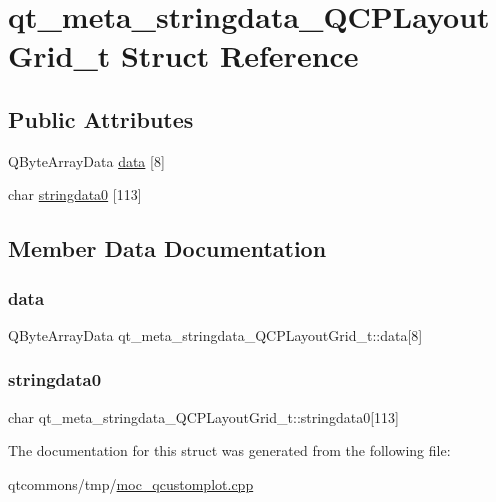 \hypertarget{structqt__meta__stringdata___q_c_p_layout_grid__t}{}\section{qt\+\_\+meta\+\_\+stringdata\+\_\+\+Q\+C\+P\+Layout\+Grid\+\_\+t Struct Reference}
\label{structqt__meta__stringdata___q_c_p_layout_grid__t}
\subsection*{Public Attributes}
\begin{DoxyCompactItemize}
\item 
Q\+Byte\+Array\+Data \mbox{\hyperlink{structqt__meta__stringdata___q_c_p_layout_grid__t_a8aec8565fec735b55e957fb91729f90c}{data}} \mbox{[}8\mbox{]}
\item 
char \mbox{\hyperlink{structqt__meta__stringdata___q_c_p_layout_grid__t_afbe8e2975fe74d0cea2af91ee7282757}{stringdata0}} \mbox{[}113\mbox{]}
\end{DoxyCompactItemize}


\subsection{Member Data Documentation}
\mbox{\label{structqt__meta__stringdata___q_c_p_layout_grid__t_a8aec8565fec735b55e957fb91729f90c}} 
\subsubsection{\texorpdfstring{data}{data}}
{\footnotesize\ttfamily Q\+Byte\+Array\+Data qt\+\_\+meta\+\_\+stringdata\+\_\+\+Q\+C\+P\+Layout\+Grid\+\_\+t\+::data\mbox{[}8\mbox{]}}

\mbox{\label{structqt__meta__stringdata___q_c_p_layout_grid__t_afbe8e2975fe74d0cea2af91ee7282757}} 
\subsubsection{\texorpdfstring{stringdata0}{stringdata0}}
{\footnotesize\ttfamily char qt\+\_\+meta\+\_\+stringdata\+\_\+\+Q\+C\+P\+Layout\+Grid\+\_\+t\+::stringdata0\mbox{[}113\mbox{]}}



The documentation for this struct was generated from the following file\+:\begin{DoxyCompactItemize}
\item 
qtcommons/tmp/\mbox{\hyperlink{moc__qcustomplot_8cpp}{moc\+\_\+qcustomplot.\+cpp}}\end{DoxyCompactItemize}
